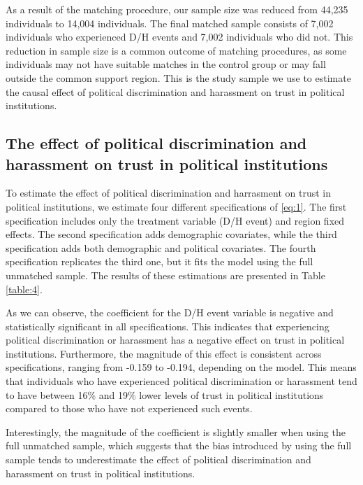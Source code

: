 \documentclass{article}
\begin{document}


As a result of the matching procedure, our sample size was reduced from 44,235 individuals to 14,004 individuals. The final matched sample consists of 7,002 individuals who experienced D/H events and 7,002 individuals who did not. This reduction in sample size is a common outcome of matching procedures, as some individuals may not have suitable matches in the control group or may fall outside the common support region. This is the study sample we use to estimate the causal effect of political discrimination and harassment on trust in political institutions.

\subsection{The effect of political discrimination and harassment on trust in political institutions}

To estimate the effect of political discrimination and harrasment on trust in political institutions, we estimate four different specifications of \ref{eq:1}. The first specification includes only the treatment variable (D/H event) and region fixed effects. The second specification adds demographic covariates, while the third specification adds both demographic and political covariates. The fourth specification replicates the third one, but it fits the model using the full unmatched sample. The results of these estimations are presented in Table \ref{table:4}.



As we can observe, the coefficient for the D/H event variable is negative and statistically significant in all specifications. This indicates that experiencing political discrimination or harassment has a negative effect on trust in political institutions. Furthermore, the magnitude of this effect is consistent across specifications, ranging from -0.159 to -0.194, depending on the model. This means that individuals who have experienced political discrimination or harassment tend to have between 16\% and 19\% lower levels of trust in political institutions compared to those who have not experienced such events. 

Interestingly, the magnitude of the coefficient is slightly smaller when using the full unmatched sample, which suggests that the bias introduced by using the full sample tends to underestimate the effect of political discrimination and harassment on trust in political institutions.
\end{document}
